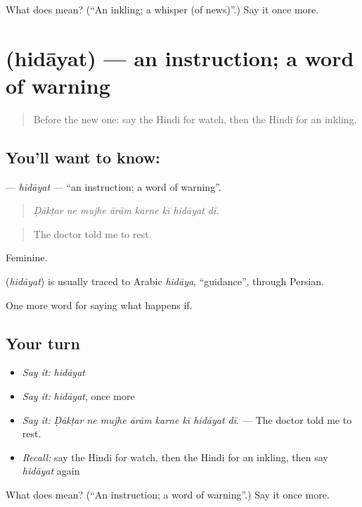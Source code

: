 \begin{tcolorbox}[breakable,colback=teal!4,colframe=teal!35!black,title={Before you move on}]
What does  mean? (\textquotedblleft{}An inkling; a whisper (of news)\textquotedblright{}.) Say it once more.
\end{tcolorbox}
\section[\texorpdfstring{\hi{हिदायत} (hidāyat)}{हिदायत (hidāyat)}]{ (hidāyat) — an instruction; a word of warning}

\label{lesson:HI-C547-hidayat}



\begin{quote}
Before the new one: say the Hindi for watch, then the Hindi for an inkling.
\end{quote}

\subsection*{You'll want to know: }
\textbf{} — \emph{hidāyat} — \textquotedblleft{}an instruction; a word of warning\textquotedblright{}.

\begin{quote}
       
\end{quote}

\begin{quote}
\emph{Ḍākṭar ne mujhe ārām karne kī hidāyat dī.}
\end{quote}

\begin{quote}
The doctor told me to rest.
\end{quote}

Feminine.

\begin{cousinweb}
\textbf{} (\emph{hidāyat}) is usually traced to Arabic \emph{hidāya}, \textquotedblleft{}guidance\textquotedblright{}, through Persian.
\end{cousinweb}

\begin{grammarlens}[title={What you've built}]
One more word for saying what happens if.
\end{grammarlens}

\subsection*{Your turn}
\begin{itemize}
\raggedright
  \item \emph{Say it:} \emph{hidāyat}
  \item \emph{Say it:} \emph{hidāyat}, once more
  \item \emph{Say it:} \emph{Ḍākṭar ne mujhe ārām karne kī hidāyat dī.} — The doctor told me to rest.
  \item \emph{Recall:} say the Hindi for watch, then the Hindi for an inkling, then say \emph{hidāyat} again
\end{itemize}

\begin{tcolorbox}[breakable,colback=teal!4,colframe=teal!35!black,title={Before you move on}]
What does  mean? (\textquotedblleft{}An instruction; a word of warning\textquotedblright{}.) Say it once more.
\end{tcolorbox}
